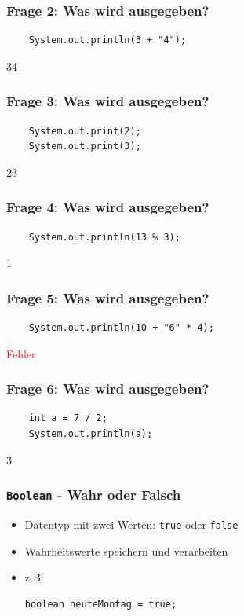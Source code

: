 \documentclass{../../presentation}
\begin{document}
\begin{frame}[fragile]
	\frametitle{Frage 2: Was wird ausgegeben?}
	\begin{verbatim}
    System.out.println(3 + "4");
  \end{verbatim}
	\pause
	\begin{ausgabe}
		34
	\end{ausgabe}
\end{frame}

\begin{frame}[fragile]
	\frametitle{Frage 3: Was wird ausgegeben?}
	\begin{verbatim}
    System.out.print(2);
    System.out.print(3);
  \end{verbatim}
	\pause
	\begin{ausgabe}
		23
	\end{ausgabe}
\end{frame}

\begin{frame}[fragile]
	\frametitle{Frage 4: Was wird ausgegeben?}
	\begin{verbatim}
    System.out.println(13 % 3);
  \end{verbatim}
	\pause
	\begin{ausgabe}
		1
	\end{ausgabe}
\end{frame}

\begin{frame}[fragile]
	\frametitle{Frage 5: Was wird ausgegeben?}
	\begin{verbatim}
    System.out.println(10 + "6" * 4);
  \end{verbatim}
	\pause
	\begin{ausgabe}
		\textcolor{red}{Fehler}
	\end{ausgabe}
\end{frame}

\begin{frame}[fragile]
	\frametitle{Frage 6: Was wird ausgegeben?}
	\begin{verbatim}
    int a = 7 / 2;
    System.out.println(a);
  \end{verbatim}
	\pause
	\begin{ausgabe}
		3
	\end{ausgabe}
\end{frame}

\begin{frame}[fragile]
	\frametitle{\texttt{Boolean} - Wahr oder Falsch}
	\pause
	\begin{itemize}
		\item Datentyp mit zwei Werten: \texttt{true} oder \texttt{false}
		      \pause
		\item Wahrheitswerte speichern und verarbeiten
		      \pause
		\item z.B:
		      \begin{verbatim}
boolean heuteMontag = true;
    \end{verbatim}

	\end{itemize}
\end{frame}
\end{document}
